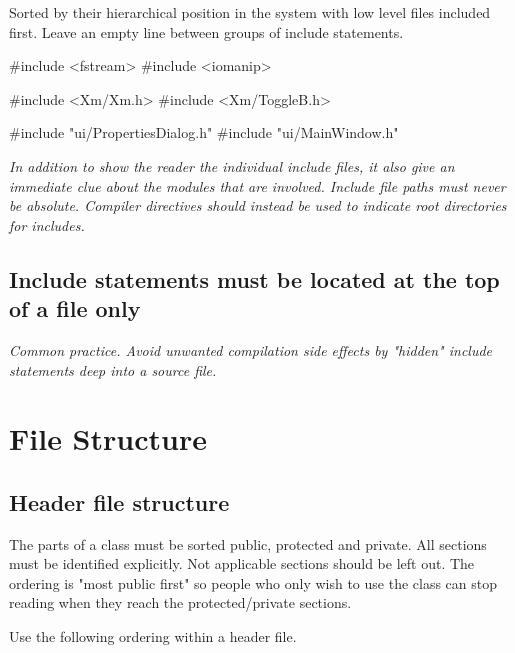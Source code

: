\documentclass[a4paper,11pt,oneside]{scrbook}
\newcommand{\guideline}[1]{{\subsection{#1}}}
\newcommand{\motivation}[1]{{\normalfont \itshape #1}}
\begin{document}
Sorted by their hierarchical position in the system with low level files
included first. Leave an empty line between groups of include statements.

\begin{code}
  #include <fstream>
  #include <iomanip>

  #include <Xm/Xm.h>
  #include <Xm/ToggleB.h>

  #include "ui/PropertiesDialog.h"
  #include "ui/MainWindow.h" 
\end{code}

\motivation{
  In addition to show the reader the individual include files, it also give an
  immediate clue about the modules that are involved. Include file paths must
  never be absolute. Compiler directives should instead be used to indicate root
  directories for includes.
}

\guideline{Include statements must be located at the top of a file only}

\motivation{ 
  Common practice. Avoid unwanted compilation side effects
  by "hidden" include statements deep into a source file.
}

\section{File Structure}

\guideline{Header file structure}

The parts of a class must be sorted public, protected and private. All
sections must be identified explicitly. Not applicable sections should
be left out.  The ordering is "most public first" so people who only
wish to use the class can stop reading when they reach the
protected/private sections.

Use the following ordering within a header file.
\end{document}
